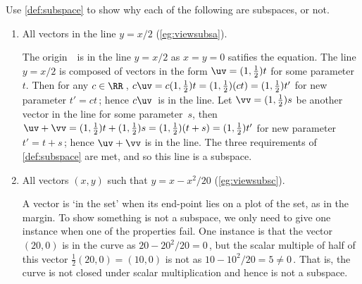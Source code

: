 \begin{example} \label{eg:somsubs}
Use \autoref{def:subspace} to show why each of the following are subspaces, or not. 
\begin{enumerate}
\item All vectors in the line \(y=x/2\) (\autoref{eg:viewsubsa}).
\begin{solution} 
The origin~\ov\ is in the line \(y=x/2\) as \(x=y=0\) satifies the equation.
%
The line \(y=x/2\) is composed of vectors in the form \(\uv=(1,\frac12)t\) for some parameter~\(t\).
Then for any \(c\in\RR\)\,, \(c\uv=c(1,\frac12)t=(1,\frac12)(ct)=(1,\frac12)t'\) for new parameter \(t'=ct\)\,; hence \(c\uv\)~is in the line.
Let \(\vv=(1,\frac12)s\) be another vector in the line for some parameter~\(s\), then \(\uv+\vv=(1,\frac12)t+(1,\frac12)s=(1,\frac12)(t+s)=(1,\frac12)t'\) for new parameter \(t'=t+s\)\,; hence \(\uv+\vv\) is in the line.
The three requirements of \autoref{def:subspace} are met, and so this line is a subspace. 
\end{solution}

\item All vectors \((x,y)\) such that \(y=x-x^2/20\) (\autoref{eg:viewsubsc}).
\begin{solution} 
A vector is `in the set' when its end-point lies on a plot of the set, as in the margin.
%
To show something is not a subspace, we only need to give one instance when one of the properties fail.
One instance is that the vector \((20,0)\) is in the curve as \(20-20^2/20=0\)\,, but the scalar multiple of half of this vector \(\frac12(20,0)=(10,0)\) is not as \(10-10^2/20=5\neq0\)\,.
That is, the curve is not closed under scalar multiplication and hence is not a subspace. 
\end{solution}


\end{enumerate}
\end{example}

